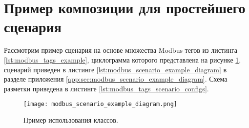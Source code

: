 \section{Пример композиции для простейшего сценария}

Рассмотрим пример сценария на основе множества Modbus тегов из листинга \ref{lst:modbus_tags_example},
циклограмма которого представлена на рисунке \ref{fig:modbus_scenario_example_diagram},
сценарий приведен в листинге \ref{lst:modbus_scenario_example_diagram} в разделе приложения \ref{app:sec:modbus_scenario_example_diagram}.
Схема разметки приведена в листинге \ref{lst:modbus_tags_scenario_configs}.

\begin{landscape}
    \begin{center}
        \begin{figure}
            \texttt{[image: modbus\_scenario\_example\_diagram.png]}
            \caption{Пример использования классов.}\label{fig:modbus_scenario_example_diagram}
        \end{figure}
    \end{center}
\end{landscape}
